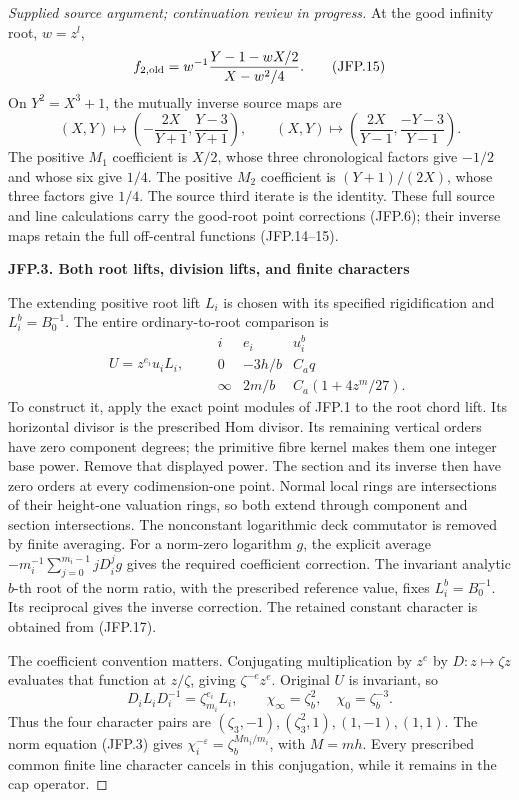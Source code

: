 \begin{proof}[Supplied source argument; continuation review in progress]
At the good infinity root, \(w=z^l\),
\[
 f_{2,\rm old}=w^{-1}\frac{Y-1-wX/2}{X-w^2/4}.
\tag{JFP.15}
\]
On \(Y^2=X^3+1\), the mutually inverse source maps are
\[
 (X,Y)\mapsto\left(-\frac{2X}{Y+1},\frac{Y-3}{Y+1}\right),
 \qquad
 (X,Y)\mapsto\left(\frac{2X}{Y-1},\frac{-Y-3}{Y-1}\right).
\tag{JFP.16}
\]
The positive \(M_1\) coefficient is \(X/2\), whose three
chronological factors give \(-1/2\) and whose six give \(1/4\).
The positive \(M_2\) coefficient is \((Y+1)/(2X)\), whose
three factors give \(1/4\). The source third iterate is the
identity. These full source and line calculations carry the
good-root point corrections (JFP.6); their inverse maps retain
the full off-central functions (JFP.14--15).

\par

\medskip\noindent\textbf{JFP.3. Both root lifts, division lifts, and finite characters}

\par\nobreak

The extending positive root lift \(L_i\) is chosen with its
specified rigidification and \(L_i^b=B_0^{-1}\). The entire
ordinary-to-root comparison is
\[
 U=z^{e_i}u_i L_i,\qquad
 \begin{array}{c|c|c}
 i&e_i&u_i^b\\\hline
 0&-3h/b&C_aq\\
 \infty&2m/b&C_a(1+4z^m/27).
 \end{array}
\tag{JFP.17}
\]
To construct it, apply the exact point modules of JFP.1 to the
root chord lift. Its horizontal divisor is the prescribed Hom
divisor. Its remaining vertical orders have zero component degrees;
the primitive fibre kernel makes them one integer base power.
Remove that displayed power. The section and its inverse then
have zero orders at every codimension-one point. Normal local
rings are intersections of their height-one valuation rings, so
both extend through component and section intersections. The
nonconstant logarithmic deck commutator is removed by finite
averaging. For a norm-zero logarithm \(g\), the explicit average
\(-m_i^{-1}\sum_{j=0}^{m_i-1}jD_i^jg\) gives the required
coefficient correction. The invariant analytic \(b\)-th root
of the norm ratio, with the prescribed reference value, fixes
\(L_i^b=B_0^{-1}\). Its reciprocal gives the inverse correction.
The retained constant character is obtained from (JFP.17).

The coefficient convention matters. Conjugating multiplication
by \(z^e\) by \(D:z\mapsto\zeta z\) evaluates that function
at \(z/\zeta\), giving \(\zeta^{-e}z^e\). Original \(U\)
is invariant, so
\[
 D_iL_iD_i^{-1}=\zeta_{m_i}^{e_i}L_i,\qquad
 \chi_\infty=\zeta_b^2,\quad\chi_0=\zeta_b^{-3}.
\tag{JFP.18}
\]
Thus the four character pairs are
\((\zeta_3,-1),(\zeta_3^2,1),(1,-1),(1,1)\).
The norm equation (JFP.3) gives
\(\chi_i^{-\varepsilon}=\zeta_b^{Mn_i/m_i}\),
with \(M=mh\). Every prescribed common finite line character
cancels in this conjugation, while it remains in the cap operator.


\end{proof}
